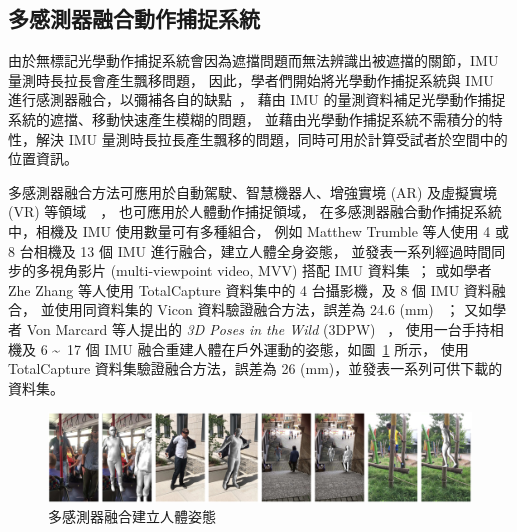 \clearpage

\subsection{多感測器融合動作捕捉系統}
由於無標記光學動作捕捉系統會因為遮擋問題而無法辨識出被遮擋的關節，IMU 量測時長拉長會產生飄移問題，
因此，學者們開始將光學動作捕捉系統與 IMU 進行感測器融合，以彌補各自的缺點~\cite{li2023visual}，
藉由 IMU 的量測資料補足光學動作捕捉系統的遮擋、移動快速產生模糊的問題，
並藉由光學動作捕捉系統不需積分的特性，解決 IMU 量測時長拉長產生飄移的問題，同時可用於計算受試者於空間中的位置資訊。

多感測器融合方法可應用於自動駕駛、智慧機器人、增強實境 (AR) 及虛擬實境 (VR) 等領域~\cite{jinyu2019survey}~\cite{zhu2023camera}，
也可應用於人體動作捕捉領域，
在多感測器融合動作捕捉系統中，相機及 IMU 使用數量可有多種組合，
例如 Matthew Trumble 等人使用 4 或 8 台相機及 13 個 IMU 進行融合，建立人體全身姿態，
並發表一系列經過時間同步的多視角影片 (multi-viewpoint video, MVV) 搭配 IMU 資料集~\cite{Trumble:BMVC:2017}；
或如學者 Zhe Zhang 等人使用 TotalCapture 資料集中的 4 台攝影機，及 8 個 IMU 資料融合，
並使用同資料集的 Vicon 資料驗證融合方法，誤差為 24.6 (mm) ~\cite{Zhang_2020_CVPR}；
又如學者 Von Marcard 等人提出的 \textit{3D Poses in the Wild} (3DPW) ~\cite{vonMarcard2018}，
使用一台手持相機及 6 \textasciitilde\ 17 個 IMU 融合重建人體在戶外運動的姿態，如圖~\ref{ch2_fig_3DPW} 所示，
使用 TotalCapture 資料集驗證融合方法，誤差為 26 (mm)，並發表一系列可供下載的資料集。

\begin{figure}[!ht]
    \centering
    \includegraphics[width=\linewidth]{figure/ch2_fig_3DPW.png}
     \caption[多感測器融合建立人體姿態~\cite{vonMarcard2018}]{多感測器融合建立人體姿態~\cite{vonMarcard2018}}
     \label{ch2_fig_3DPW}
\end{figure}

\clearpage

